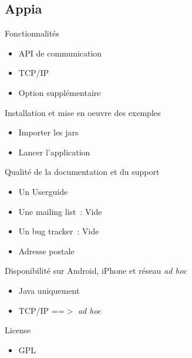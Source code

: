 \documentclass{beamer}
\begin{document}
\subsection{Appia}

\begin{frame}
  \begin{block}{Fonctionnalités}
    \begin{itemize}
      \item API de communication
      \item TCP$/$IP
      \item Option supplémentaire
    \end{itemize}
  \end{block}
  \begin{block}{Installation et mise en oeuvre des exemples}
    \begin{itemize}
      \item Importer les jars
      \item Lancer l'application
    \end{itemize}
  \end{block}
\end{frame}
\begin{frame}
  \begin{block}{Qualité de la documentation et du support}
    \begin{itemize}
      \item Un Userguide
      \item Une mailing list~: Vide
      \item Un bug tracker~: Vide
      \item Adresse postale
    \end{itemize}
  \end{block}
  \begin{block}{Disponibilité sur Android, iPhone et réseau \emph{ad hoc}}
    \begin{itemize}
      \item Java uniquement
      \item TCP$/$IP ==$>$ \emph{ad hoc}
    \end{itemize}
  \end{block}
  \begin{block}{License}
    \begin{itemize}
      \item GPL
    \end{itemize}
  \end{block}
\end{frame}
\end{document}
